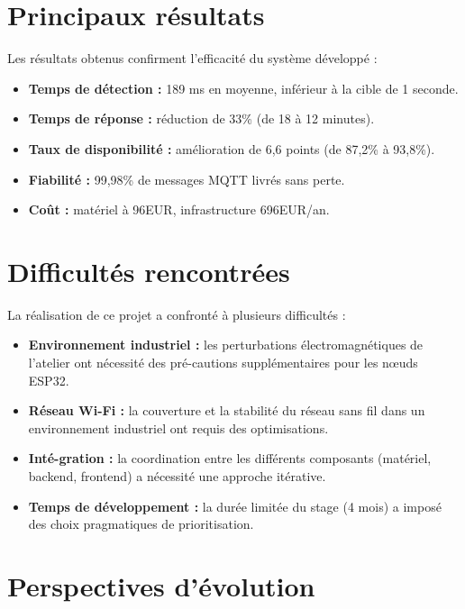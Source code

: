 \section{Principaux r\'esultats}

Les r\'esultats obtenus confirment l'efficacit\'e du syst\`eme d\'evelopp\'e :

\begin{itemize}
    \item \textbf{Temps de d\'etection :} 189 ms en moyenne, inf\'erieur \`a la cible de 1 seconde.
    \item \textbf{Temps de r\'eponse :} r\'eduction de 33\% (de 18 \`a 12 minutes).
    \item \textbf{Taux de disponibilit\'e :} am\'elioration de 6,6 points (de 87,2\% \`a 93,8\%).
    \item \textbf{Fiabilit\'e :} 99,98\% de messages MQTT livr\'es sans perte.
    \item \textbf{Co\^ut :} mat\'eriel \`a 96EUR, infrastructure 696EUR/an.
\end{itemize}

\section{Difficult\'es rencontr\'ees}

La r\'ealisation de ce projet a confront\'e \`a plusieurs difficult\'es :

\begin{itemize}
    \item \textbf{Environnement industriel :} les perturbations \'electromagn\'etiques de l'atelier ont n\'ecessit\'e des pr\'e-cautions suppl\'ementaires pour les n\oe{}uds ESP32.
    \item \textbf{R\'eseau Wi-Fi :} la couverture et la stabilit\'e du r\'eseau sans fil dans un environnement industriel ont requis des optimisations.
    \item \textbf{Int\'e-gration :} la coordination entre les diff\'erents composants (mat\'eriel, backend, frontend) a n\'ecessit\'e une approche it\'erative.
    \item \textbf{Temps de d\'eveloppement :} la dur\'ee limit\'ee du stage (4 mois) a impos\'e des choix pragmatiques de prioritisation.
\end{itemize}

\section{Perspectives d'\'evolution}

